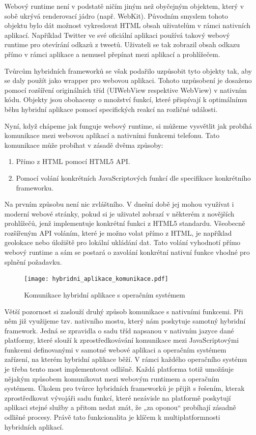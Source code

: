 Webový runtime není v podstatě ničím jiným než obyčejným objektem, který v sobě ukrývá renderovací jádro (např. WebKit). Původním smyslem tohoto objektu bylo dát možnost vykreslovat HTML obsah uživatelům v rámci nativních aplikací. Například Twitter ve své oficiální aplikaci používá takový webový runtime pro otevírání odkazů z tweetů. Uživateli se tak zobrazil obsah odkazu přímo v rámci aplikace a nemusel přepínat mezi aplikací a prohlížečem.

Tvůrcům hybridních frameworků se však podařilo uzpůsobit tyto objekty tak, aby se daly použít jako wrapper pro webovou aplikaci. Tohoto uzpůsobení je dosaženo pomocí rozšíření originálních tříd (UIWebView respektive WebView) v nativním kódu. Objekty jsou obohaceny o množství funkcí, které přispívají k optimálnímu běhu hybridní aplikace pomocí specifických reakcí na rozličné události.

Nyní, když chápeme jak funguje webový runtime, si můžeme vysvětlit jak probíhá komunikace mezi webovou aplikací a nativními funkcemi telefonu. Tato komunikace může probíhat v zásadě dvěma způsoby:

\begin{enumerate}
	\item Přímo z HTML pomocí HTML5 API.
	\item Pomocí volání konkrétních JavaScriptových funkcí dle specifikace konkrétního frameworku.
\end{enumerate}

Na prvním způsobu není nic zvláštního. V dnešní době jej mohou využívat i moderní webové stránky, pokud si je uživatel zobrazí v některém z novějších prohlížečů, jenž implementuje konkrétní funkci z HTML5 standardu. Všeobecně rozšířeným API voláním, které je možno volat přímo z HTML, je například geolokace nebo úložiště pro lokální ukládání dat. Tato volání vyhodnotí přímo webový runtime a sám se postará o zavolání konkrétní nativní funkce vhodné pro splnění požadavku.

\begin{figure}\centering
\texttt{[image: hybridni\_aplikace\_komunikace.pdf]}
\caption{Komunikace hybridní aplikace s operačním systémem}
\label{fig:HybridAppCommunication}
\end{figure} 

Větší pozornost si zaslouží druhý způsob komunikace s nativními funkcemi. Při něm již využijeme tzv. nativního mostu, který nám poskytuje samotný hybridní framework. Jedná se zpravidla o sadu tříd napsanou v nativním jazyce dané platformy, které slouží k zprostředkovávání komunikace mezi JavaScriptovými funkcemi definovanými v samotné webové aplikaci a operačním systémem zařízení, na kterém hybridní aplikace běží. V rámci každého operačního systému je třeba tento most implementovat odlišně. Každá platforma totiž umožňuje nějakým způsobem komunikovat mezi webovým runtimem a operačním systémem. Úkolem pro tvůrce hybridních frameworků je přijít s řešením, kterak zprostředkovat vývojáři sadu funkcí, které nezávisle na platformě poskytují aplikaci stejné služby a přitom nedat znát, že „za oponou“ probíhají zásadně odlišné procesy. Právě tato funkcionalita je klíčem k multiplatformnosti hybridních aplikací.

